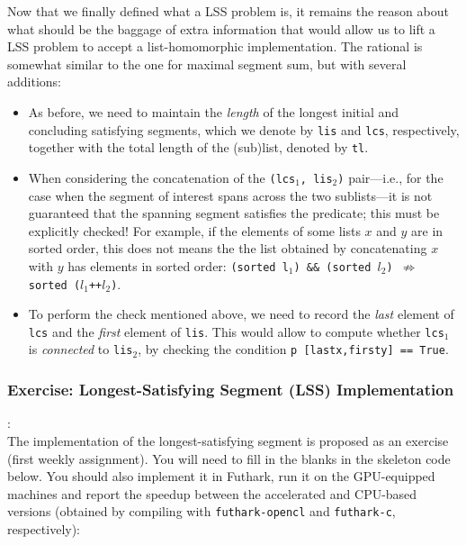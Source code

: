 \documentclass[acmsmall,review]{acmart}\settopmatter{printfolios=true,printccs=false,printacmref=false}
\begin{document}
Now that we finally defined what a LSS problem is, it remains the reason about
what should be the baggage of extra information that would allow us to lift a 
LSS problem to accept a list-homomorphic implementation. The rational is
somewhat similar to the one for maximal segment sum, but with several additions:

\begin{itemize}
    \item As before, we need to maintain the \emph{length} of the longest 
            initial and concluding satisfying segments, which we denote
            by {\tt lis} and {\tt lcs}, respectively, together with the
            total length of the (sub)list, denoted by {\tt tl}.

    \item When considering the concatenation of the {\tt (lcs$_1$, lis$_2$)} 
            pair---i.e., for the case when the segment of interest spans 
            across the two sublists---it is not guaranteed that the spanning 
            segment satisfies the predicate; this must be explicitly checked! 
            For example, if the elements of some lists $x$ and $y$ are in 
            sorted order, this does not means the the list obtained by 
            concatenating $x$ with $y$ has elements in sorted order: 
            {\tt (sorted l$_1$) \&\& (sorted $l_2$) $\not\Rightarrow$ sorted ($l_1$++$l_2$)}.  
            
    \item To perform the check mentioned above, we need to record the 
            \emph{last} element of {\tt lcs} and the \emph{first} element of {\tt lis}.
            This would allow to compute whether {\tt lcs$_1$} is \emph{connected} 
            to {\tt lis$_2$}, by checking the condition {\tt p [lastx,firsty] == True}.
\end{itemize}

\subsubsection{Exercise: Longest-Satisfying Segment (LSS) Implementation}:
$\mbox{ }$\\

The implementation of the longest-satisfying segment is proposed as an exercise
(first weekly assignment).  You will need to fill in the blanks in the skeleton
code below. You should also implement it in Futhark, run it on the GPU-equipped
machines and report the speedup between the accelerated and CPU-based versions
(obtained by compiling with {\tt futhark-opencl} and {\tt futhark-c}, 
respectively):\bigskip
\end{document}
